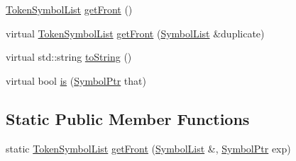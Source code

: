 \begin{DoxyCompactItemize}
\item 
\mbox{\hyperlink{namespace_erable_1_1_compiler_1_1_symbols_aff1ccebebde106c3c5f3cdca118a1d69}{Token\+Symbol\+List}} \mbox{\hyperlink{class_erable_1_1_compiler_1_1_symbols_1_1_symbol_a5602a81abe926c65b260f88812e7f3bc}{get\+Front}} ()
\item 
virtual \mbox{\hyperlink{namespace_erable_1_1_compiler_1_1_symbols_aff1ccebebde106c3c5f3cdca118a1d69}{Token\+Symbol\+List}} \mbox{\hyperlink{class_erable_1_1_compiler_1_1_symbols_1_1_symbol_a59ebadb3a895ead008c23e71ac1dbc06}{get\+Front}} (\mbox{\hyperlink{namespace_erable_1_1_compiler_1_1_symbols_a63e8157d2f729d4689d27bacad42f8ed}{Symbol\+List}} \&duplicate)
\item 
virtual std\+::string \mbox{\hyperlink{class_erable_1_1_compiler_1_1_symbols_1_1_symbol_aa9ae79d1be39c0e325e7edc75285c2a7}{to\+String}} ()
\item 
virtual bool \mbox{\hyperlink{class_erable_1_1_compiler_1_1_symbols_1_1_symbol_a0d50ab85e48e583a4664a1fa37fe6791}{is}} (\mbox{\hyperlink{namespace_erable_1_1_compiler_1_1_symbols_a8f0bc762f448ea4d84e8713ab3e140b9}{Symbol\+Ptr}} that)
\end{DoxyCompactItemize}
\subsection*{Static Public Member Functions}
\begin{DoxyCompactItemize}
\item 
static \mbox{\hyperlink{namespace_erable_1_1_compiler_1_1_symbols_aff1ccebebde106c3c5f3cdca118a1d69}{Token\+Symbol\+List}} \mbox{\hyperlink{class_erable_1_1_compiler_1_1_symbols_1_1_symbol_ac92504232d5b2559963ff6b2ec1eb552}{get\+Front}} (\mbox{\hyperlink{namespace_erable_1_1_compiler_1_1_symbols_a63e8157d2f729d4689d27bacad42f8ed}{Symbol\+List}} \&, \mbox{\hyperlink{namespace_erable_1_1_compiler_1_1_symbols_a8f0bc762f448ea4d84e8713ab3e140b9}{Symbol\+Ptr}} exp)
\end{DoxyCompactItemize}
